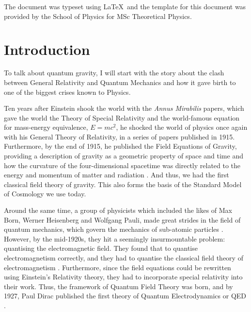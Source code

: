 \documentclass[12pt,a4paper]{report}
\theoremstyle{plain}
\theoremstyle{definition}
\theoremstyle{remark}
\begin{document}
The document was typeset using \LaTeX\ and the template for this document was provided by the School of Physics for MSc Theoretical Physics.

\newpage
\tableofcontents
\newpage
\listoffigures

\newpage
{}
\chapter{Introduction}

To talk about quantum gravity, I will start with the story about the clash between General Relativity and Quantum Mechanics and how it gave birth to one of the biggest crises known to Physics.

Ten years after Einstein shook the world with the \textit{Annus Mirabilis} papers, which gave the world the Theory of Special Relativity and the world-famous equation for mass-energy equivalence, $E = mc^2$, he shocked the world of physics once again with his General Theory of Relativity, in a series of papers published in 1915. Furthermore, by the end of 1915, he published the Field Equations of Gravity, providing a description of gravity as a geometric property of space and time and how the curvature of the four-dimensional spacetime was directly related to the energy and momentum of matter and radiation \cite{EinsteinFieldEq}. And thus, we had the first classical field theory of gravity. This also forms the basis of the Standard Model of Cosmology we use today.

Around the same time, a group of physicists which included the likes of Max Born, Werner Heisenberg and Wolfgang Pauli, made great strides in the field of quantum mechanics, which govern the mechanics of sub-atomic particles \cite{BornQM, BornHeisen}. However, by the mid-1920s, they hit a seemingly insurmountable problem: quantising the electromagnetic field. They found that to quantise electromagnetism correctly, and they had to quantise the classical field theory of electromagnetism \cite{PauliQE}. Furthermore, since the field equations could be rewritten using Einstein's Relativity theory, they had to incorporate special relativity into their work. Thus, the framework of Quantum Field Theory was born, and by 1927, Paul Dirac published the first theory of Quantum Electrodynamics or QED \cite{DiracFirstQED}. 
\end{document}
